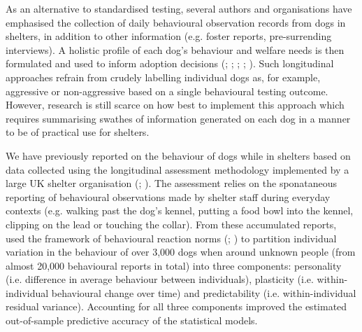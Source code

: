 \documentclass[12pt]{article}
\begin{document}
As an alternative to standardised testing, several authors and organisations have emphasised the collection of daily behavioural observation records from dogs in shelters, in addition to other information (e.g. foster reports, pre-surrending interviews). A holistic profile of each dog's behaviour and welfare needs is then formulated and used to inform adoption decisions (\cite{patronek2019}; \cite{ASPCA2018}; \cite{rayment2015}; \cite{mornement2015}; \cite{clay2020}). Such longitudinal approaches refrain from crudely labelling individual dogs as, for example, aggressive or non-aggressive based on a single behavioural testing outcome. However, research is still scarce on how best to implement this approach which requires summarising swathes of information generated on each dog in a manner to be of practical use for shelters.

We have previously reported on the behaviour of dogs while in shelters based on data collected using the longitudinal assessment methodology implemented by a large UK shelter organisation (\cite{goold2017aggressiveness}; \cite{goold2017modelling}). The assessment relies on the sponataneous reporting of behavioural observations made by shelter staff during everyday contexts (e.g. walking past the dog's kennel, putting a food bowl into the kennel, clipping on the lead or touching the collar). From these accumulated reports, \textcite{goold2017modelling} used the framework of behavioural reaction norms (\cite{dingemanse2010}; \cite{cleasby2015}) to partition individual variation in the behaviour of over 3,000 dogs when around unknown people (from almost 20,000 behavioural reports in total) into three components: personality (i.e. difference in average behaviour between individuals), plasticity (i.e. within-individual behavioural change over time) and predictability (i.e. within-individual residual variance). Accounting for all three components improved the estimated out-of-sample predictive accuracy of the statistical models.
\end{document}
